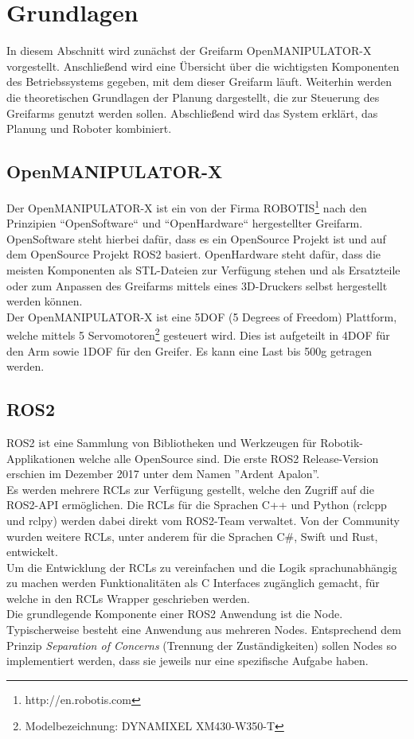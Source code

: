 \section {Grundlagen}
In diesem Abschnitt wird zunächst der Greifarm OpenMANIPULATOR-X vorgestellt.
Anschließend wird eine Übersicht über die wichtigsten Komponenten des Betriebssystems gegeben, mit dem dieser Greifarm läuft.
Weiterhin werden die theoretischen Grundlagen der Planung dargestellt, die zur Steuerung des Greifarms genutzt werden sollen.
Abschließend wird das System erklärt, das Planung und Roboter kombiniert.
\subsection{OpenMANIPULATOR-X}
Der OpenMANIPULATOR-X ist ein von der Firma ROBOTIS{\footnote{http://en.robotis.com}} nach den Prinzipien ``OpenSoftware`` und ``OpenHardware`` hergestellter Greifarm.
OpenSoftware steht hierbei dafür, dass es ein OpenSource Projekt ist und auf dem OpenSource Projekt \ac{ROS2} basiert.
OpenHardware steht dafür, dass die meisten Komponenten als STL-Dateien zur Verfügung stehen und als Ersatzteile oder zum Anpassen des Greifarms mittels eines 3D-Druckers selbst hergestellt werden können.\\
Der OpenMANIPULATOR-X ist eine 5DOF (5 Degrees of Freedom) Plattform, welche mittels 5 Servomotoren{\footnote{Modelbezeichnung: DYNAMIXEL XM430-W350-T}} gesteuert wird.
Dies ist aufgeteilt in 4DOF für den Arm sowie 1DOF für den Greifer.
Es kann eine Last bis 500g getragen werden.
\subsection{ROS2}
\ac{ROS2} ist eine Sammlung von Bibliotheken und Werkzeugen für Robotik-Applikationen welche alle OpenSource sind.
Die erste \ac{ROS2} Release-Version erschien im Dezember 2017 unter dem Namen ''Ardent Apalon''.\\
Es werden  mehrere \acp{RCL}  zur Verfügung gestellt, welche den Zugriff auf die \ac{ROS2}-API ermöglichen.
Die \acp{RCL} für die Sprachen C++ und Python (rclcpp und rclpy) werden dabei direkt vom \ac{ROS2}-Team verwaltet.
Von der Community wurden weitere \acp{RCL}, unter anderem für die Sprachen C\#, Swift und Rust, entwickelt.\\
Um die Entwicklung der \acp{RCL} zu vereinfachen und die Logik sprachunabhängig zu machen werden Funktionalitäten als C Interfaces zugänglich gemacht, für welche in den \acp{RCL} Wrapper geschrieben werden.\\
Die grundlegende Komponente einer \ac{ROS2} Anwendung ist die Node.
Typischerweise besteht eine Anwendung aus mehreren Nodes.
Entsprechend dem Prinzip \emph{Separation of Concerns} (Trennung der Zuständigkeiten) sollen Nodes so implementiert werden, dass sie jeweils nur eine spezifische Aufgabe haben.
